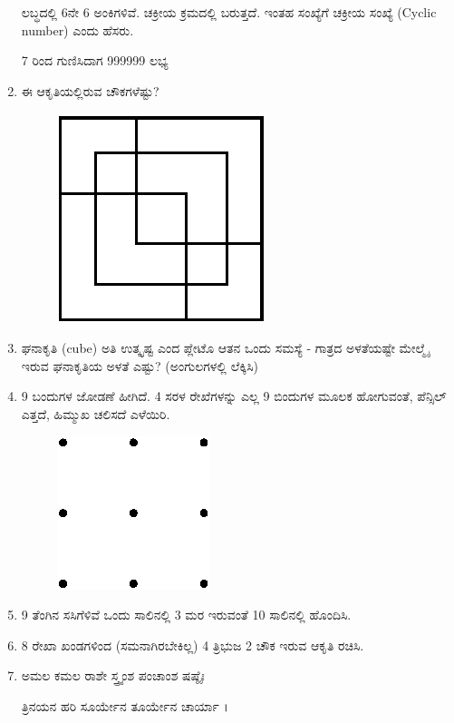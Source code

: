 \begin{enumerate}
ಲಬ್ಧದಲ್ಲಿ 6ನೇ 6 ಅಂಕಿಗಳಿವೆ. ಚಕ್ರೀಯ ಕ್ರಮದಲ್ಲಿ ಬರುತ್ತದೆ. ಇಂತಹ ಸಂಖ್ಯೆಗೆ ಚಕ್ರೀಯ ಸಂಖ್ಯೆ (Cyclic number) ಎಂದು ಹೆಸರು. 

7 ರಿಂದ ಗುಣಿಸಿದಾಗ 999999 ಲಭ್ಯ

\item ಈ ಆಕೃತಿಯಲ್ಲಿರುವ ಚೌಕಗಳೆಷ್ಟು?
\begin{figure}[H]
\centering
\includegraphics{images/chap2/q20.eps}
\end{figure}
 
\item ಘನಾಕೃತಿ (cube) ಅತಿ ಉತ್ಕೃಷ್ಟ ಎಂದ ಪ್ಲೇಟೊ ಆತನ ಒಂದು ಸಮಸ್ಯೆ - ಗಾತ್ರದ ಅಳತೆಯಷ್ಟೇ ಮೇಲ್ಮೈ ಇರುವ ಘನಾಕೃತಿಯ ಅಳತೆ ಎಷ್ಟು? (ಅಂಗುಲಗಳಲ್ಲಿ ಲೆಕ್ಕಿಸಿ)

\item 9 ಬಂದುಗಳ ಜೋಡಣೆ ಹೀಗಿದೆ. 4 ಸರಳ ರೇಖೆಗಳನ್ನು ಎಲ್ಲ 9 ಬಿಂದುಗಳ ಮೂಲಕ ಹೋಗುವಂತೆ, ಪೆನ್ಸಿಲ್ ಎತ್ತದೆ, ಹಿಮ್ಮುಖ ಚಲಿಸದೆ ಎಳೆಯಿರಿ. 
\begin{figure}[H]
\centering
\includegraphics{images/chap2/q22.eps}
\end{figure}
 
 \item 9 ತೆಂಗಿನ ಸಸಿಗೆಳಿವೆ ಒಂದು ಸಾಲಿನಲ್ಲಿ 3 ಮರ ಇರುವಂತೆ 10 ಸಾಲಿನಲ್ಲಿ ಹೊಂದಿಸಿ.
 
 \item 8 ರೇಖಾ ಖಂಡಗಳಿಂದ (ಸಮನಾಗಿರಬೇಕಿಲ್ಲ) 4 ತ್ರಿಭುಜ 2 ಚೌಕ ಇರುವ ಆಕೃತಿ ರಚಿಸಿ. 
 
 \item ಅಮಲ ಕಮಲ ರಾಶೇ ಸ್ತ್ರ್ಯಂಶ ಪಂಚಾಂಶ ಷಷ್ಠೈಃ 
 
 ತ್ರಿನಯನ ಹರಿ ಸೂರ್ಯೇನ ತೂರ್ಯೇನ ಚಾರ್ಯಾ ।
 

\end{enumerate}
